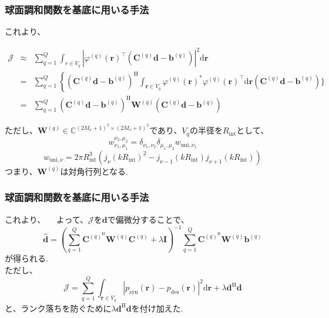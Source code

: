 \documentclass[uplatex,dvipdfmx,11pt,notheorems]{beamer}
\theoremstyle{definition}
\begin{document}
  \begin{frame}\frametitle{球面調和関数を基底に用いる手法}
これより、
	\begin{scriptsize}
	\begin{eqnarray}
	\mathcal{J} &\approx& \sum_{q=1}^{Q} \int_{r \in V_{q}}\left|\varphi^{(q)}(\boldsymbol{r})^{\top}\left(\boldsymbol{C}^{(q)} \boldsymbol{d}-\boldsymbol{b}^{(q)}\right)\right|^{2} \mathrm{d} \boldsymbol{r}\\
	&=&  \sum_{q=1}^{Q}\left\{\left(\boldsymbol{C}^{(q)} \boldsymbol{d}-\boldsymbol{b}^{(q)}\right)^{\mathrm{H}}\right.  \int_{\boldsymbol{r} \in V_{q}} \varphi^{(q)}(\boldsymbol{r})^{*} \varphi^{(q)}(\boldsymbol{r})^{\top} \mathrm{d} \boldsymbol{r}\left(\boldsymbol{C}^{(q)} \boldsymbol{d}-\boldsymbol{b}^{(q)}\right) \}\\
    &=& \sum_{q=1}^{Q}\left(\boldsymbol{C}^{(q)} \boldsymbol{d}-\boldsymbol{b}^{(q)}\right)^{\mathrm{H}} \boldsymbol{W}^{(q)}\left(\boldsymbol{C}^{(q)} \boldsymbol{d}-\boldsymbol{b}^{(q)}\right)
    \end{eqnarray}
	\end{scriptsize}
    ただし、$\boldsymbol{W}^{(q)} \in \mathbb{C}^{\left(2 M_{\nu}+1\right)^{2} \times\left(2 M_{\nu}+1\right)^{2}}$であり、$V_{q}$の半径を$ R_{\mathrm{int}}$として、
    $$w_{\nu_{1}, \mu_{1}}^{\nu_{2}, \mu_{2}}=\delta_{\nu_{1}, \nu_{2}} \delta_{\mu_{1}, \mu_{2}} w_{\mathrm{uni}, \nu_{1}}$$
    $$w_{\mathrm{uni}, \nu}=2 \pi R_{\mathrm{int}}^{3}\left(j_{\nu}\left(k R_{\mathrm{int}}\right)^{2}-j_{\nu-1}\left(k R_{\mathrm{int}}\right) j_{\nu+1}\left(k R_{\mathrm{int}}\right)\right)$$
    つまり、$\boldsymbol{W}^{(q)}$は対角行列となる.
 \end{frame}

  \begin{frame}\frametitle{球面調和関数を基底に用いる手法}
これより、
　よって、$\mathcal{J}$を$ \boldsymbol{d}$で偏微分することで、
$$\hat{\boldsymbol{d}}=\left(\sum_{q=1}^{Q} \boldsymbol{C}^{(q)^{\mathrm{H}}} \boldsymbol{W}^{(q)} \boldsymbol{C}^{(q)}+\lambda \boldsymbol{I}\right)^{-1} \sum_{q=1}^{Q} \boldsymbol{C}^{(q)^{\mathrm{H}}} \boldsymbol{W}^{(q)} \boldsymbol{b}^{(q)}$$
が得られる.\\
ただし、
$$\mathcal{J}=\sum_{q=1}^{Q} \int_{\boldsymbol{r} \in V_{q}}\left|p_{\mathrm{syn}}(\boldsymbol{r})-p_{\mathrm{des}}(\boldsymbol{r})\right|^{2} \mathrm{d} \boldsymbol{r} + \lambda  \boldsymbol{d}^{\mathrm{H}}  \boldsymbol{d}$$
と、ランク落ちを防ぐために$\lambda  \boldsymbol{d}^{\mathrm{H}} \boldsymbol{d}$を付け加えた.
 \end{frame}
\end{document}

